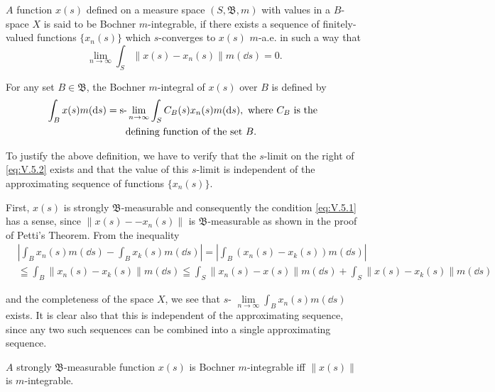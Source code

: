 \begin{definitionu} $A$ function $x(s)$ defined on a measure space $(S, \mathfrak{B}, m)$ with values in a $B$-space $X$ is said to be Bochner $m$-integrable, if there exists a sequence of finitely-valued functions $\{x_n(s)\}$ which $s$-converges to $x(s)$ $m$-a.e. in such a way that 
\begin{equation}\label{eq:V.5.1}
\lim\limits _{n \rightarrow \infty} \int_{S} \| x (s) - x _{n} (s) \| m (\dd s) = 0.
\end{equation}
\end{definitionu}

For any set $B \in \mathfrak{B}$, the Bochner $m$-integral of $x(s)$ over $B$ is defined by 
\begin{gather}\int_{B} x (s) m (\mathop{}\!\mathrm{d} s) = \text{s-}\lim _{n \rightarrow \infty} \int_{S} C _{B} (s) x _{n} (s) m (\mathop{}\!\mathrm{d} s), \text{ where } C _{B} \text{ is the } \label{eq:V.5.2} \\\quad \text{ defining function of the set } B. \notag
\end{gather}

To justify the above definition, we have to verify that the $s$-limit on the right of \eqref{eq:V.5.2} exists and that the value of this $s$-limit is independent of the approximating sequence of functions $\{x_{n}(s)\}$. 

\begin{definitionn} First, $x(s)$ is strongly $\mathfrak{B}$-measurable and consequently the condition \eqref{eq:V.5.1} has a sense, since $\|x(s) - - x_n(s)\|$ is $\mathfrak{B}$-measurable as shown in the proof of Petti's Theorem. From the inequality 
\[
\begin{aligned}
&\left| \int_{B} x _{n} (s) m (\dd s) - \int_{B} x _{k} (s) m (\dd s) \right| = \left| \int_{B} (x _{n} (s) - x _{k} (s)) m (\dd s) \right|
\\
&\leqq \int_{B} \| x _{n} (s) - x _{k} (s) \| m (\dd s) \leqq \int_{S} \| x _{n} (s) - x (s) \| m (\dd s) + \int_{S} \| x (s) - x _{k} (s) \| m (\dd s)
\end{aligned}
\]

and the completeness of the space $X$, we see that $s\text{- }\lim\limits_{n\to \infty}\int_{B}x_n(s)m(\dd s)$ 
exists. It is clear also that this \slim is independent of the approximating sequence, since any two such sequences can be combined into a single approximating sequence. 
\end{definitionn}

\begin{theorem}\label{thm:V.5.Theorem.1} $A$ strongly $\mathfrak{B}$-measurable function $x(s)$ is Bochner $m$-integrable iff $\| x(s) \|$ is $m$-integrable. 
\end{theorem}

